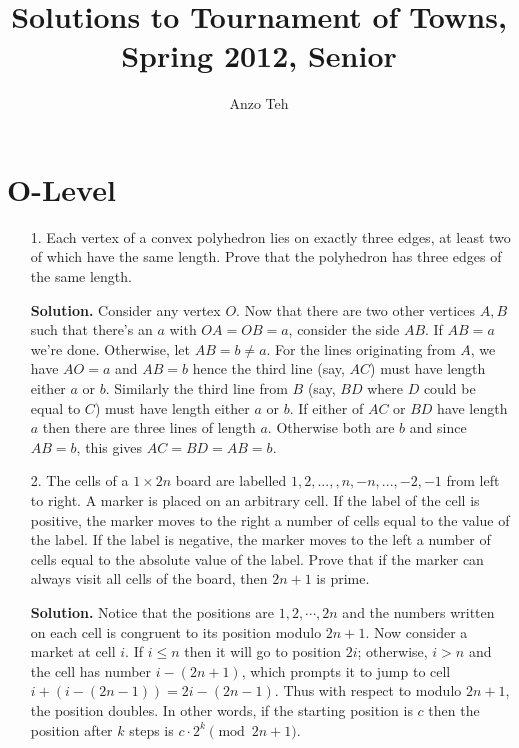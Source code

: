 \documentclass[11pt,a4paper]{article}
\begin{document}
\newcommand{\la}{\leftarrow}
\newcommand{\lra}{\leftrightarrow}
\newcommand{\bbN}{\mathbb{N}}
\newcommand{\bbZ}{\mathbb{Z}}
\newcommand{\dsum}{\displaystyle\sum}
\newcommand{\dprod}{\displaystyle\prod}


\title{Solutions to Tournament of Towns, Spring 2012, Senior}
\author{Anzo Teh}
\date{}
\maketitle

\section*{O-Level}
\begin{enumerate}
	\item[1.] Each vertex of a convex polyhedron lies on exactly three edges, at least two of which have the same length. Prove that the polyhedron has three edges of the same length.
	
	\textbf{Solution.} Consider any vertex $O$. Now that there are two other vertices $A, B$ such that there's an $a$ with $OA=OB=a$, consider the side $AB$. If $AB=a$ we're done. Otherwise, let $AB=b\neq a$. For the lines originating from $A$, we have $AO=a$ and $AB=b$ hence the third line (say, $AC$) must have length either $a$ or $b$. Similarly the third line from $B$ (say, $BD$ where $D$ could be equal to $C$) must have length either $a$ or $b$. If either of $AC$ or $BD$ have length $a$ then there are three lines of length $a$. Otherwise both are $b$ and since $AB=b$, this gives $AC=BD=AB=b$. 
	
	\item[2.] The cells of a $1\times 2n$ board are labelled $1,2,...,, n, -n,..., -2, -1$ from left to right. A marker is placed on an arbitrary cell. If the label of the cell is positive, the marker moves to the right a number of cells equal to the value of the label. If the label is negative, the marker moves to the left a number of cells equal to the absolute value of the label. Prove that if the marker can always visit all cells of the board, then $2n + 1$ is prime.
	
	\textbf{Solution.} Notice that the positions are $1, 2, \cdots , 2n$ and the numbers written on each cell is congruent to its position modulo $2n+1$. Now consider a market at cell $i$. If $i\le n$ then it will go to position $2i$; otherwise, $i>n$ and the cell has number $i-(2n+1)$, which prompts it to jump to cell $i+(i-(2n-1))=2i-(2n-1)$. Thus with respect to modulo $2n+1$, the position doubles. In other words, if the starting position is $c$ then the position after $k$ steps is $c\cdot 2^k\pmod{2n+1}$. 
	

\end{enumerate}
\end{document}
